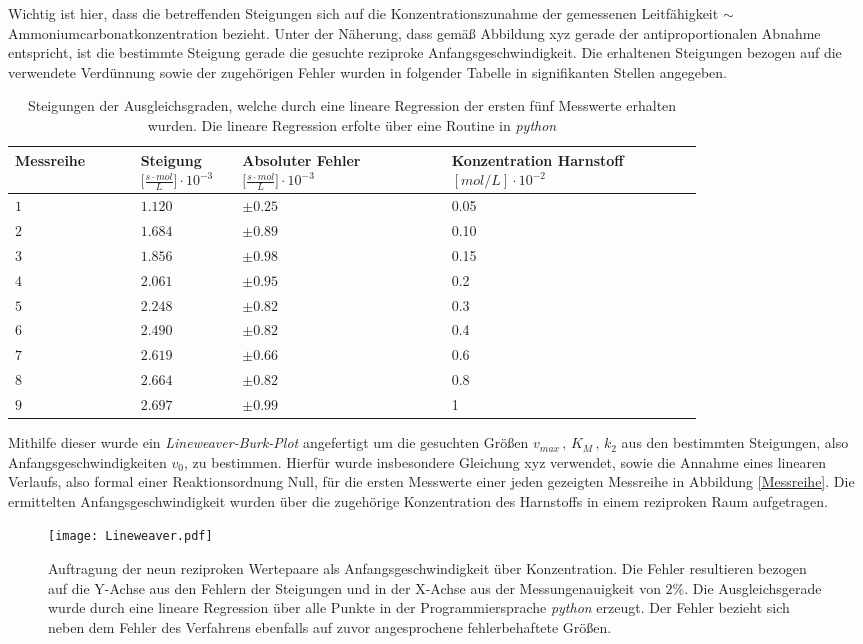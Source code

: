 Wichtig ist hier, dass die betreffenden Steigungen sich auf die Konzentrationszunahme der gemessenen Leitfähigkeit $\sim $Ammoniumcarbonatkonzentration bezieht. Unter der Näherung, dass gemäß Abbildung xyz gerade der antiproportionalen Abnahme entspricht, ist die bestimmte Steigung gerade die gesuchte reziproke Anfangsgeschwindigkeit. Die erhaltenen Steigungen bezogen auf die verwendete Verdünnung sowie der zugehörigen Fehler wurden in folgender Tabelle in signifikanten Stellen angegeben.
\begin{table}[H]
\centering
\label{Steigungstabelle}
	\caption{Steigungen der Ausgleichsgraden, welche durch eine lineare Regression der ersten fünf Messwerte erhalten wurden. Die lineare Regression erfolte über eine Routine in \textit{python}}
	\begin{tabular}{C{0.15\linewidth}|C{0.1\linewidth}C{0.25\linewidth}C{0.3\linewidth}}
		Messreihe  &  Steigung $[\si{\frac{s\cdot mol}{L}] \cdot 10^{-3}}$ &  Absoluter Fehler $[\si{\frac{s \cdot mol}{L}] \cdot 10^{-3}}$ & Konzentration Harnstoff $\si{[mol/L]}\cdot 10^{-2}$ \\
		\hline \addlinespace[1ex] 
		$ 1$ & $1.120$ & $\pm 0.25$ & 0.05\\
		$2$ & $1.684$& $ \pm 0.89$ &0.10\\
		$3$ & $1.856$& $\pm 0.98$ &0.15\\
		$4$ &$2.061$& $\pm 0.95$&0.2\\
		$5$&  $2.248$&  $\pm 0.82$ &0.3\\
		$6$&  $2.490$&  $\pm 0.82$&0.4\\
		$7$ &  $2.619$&$\pm 0.66$&0.6\\
		$8$ & $2.664$&$\pm  0.82$ &0.8\\
		$9$ &  $2.697$& $\pm 0.99$ &1\\
	\end{tabular}
\end{table}
Mithilfe dieser wurde ein \textit{Lineweaver-Burk-Plot} angefertigt um die gesuchten Größen $v_{max}\, , \, K_M\, ,\, k_2$ aus den bestimmten Steigungen, also Anfangsgeschwindigkeiten $v_0$, zu bestimmen. Hierfür wurde insbesondere Gleichung xyz verwendet, sowie die Annahme eines linearen Verlaufs, also formal einer Reaktionsordnung Null, für die ersten Messwerte einer jeden gezeigten Messreihe in Abbildung \ref{Messreihe}. Die ermittelten Anfangsgeschwindigkeit wurden über die zugehörige Konzentration des Harnstoffs in einem reziproken Raum aufgetragen.
\begin{figure}[H]
	\centering	
	\begin{minipage}{1\textwidth}
		\texttt{[image: Lineweaver.pdf]}
	\end{minipage}
	\caption{Auftragung der neun reziproken Wertepaare als Anfangsgeschwindigkeit über Konzentration. Die Fehler resultieren bezogen auf die Y-Achse aus den Fehlern der Steigungen und in der X-Achse aus der Messungenauigkeit von $2\%$. Die Ausgleichsgerade wurde durch eine lineare Regression über alle Punkte in der Programmiersprache \textit{python} erzeugt. Der Fehler bezieht sich neben dem Fehler des Verfahrens ebenfalls auf zuvor angesprochene fehlerbehaftete Größen.}
	\label{Lineweaver}
\end{figure}
